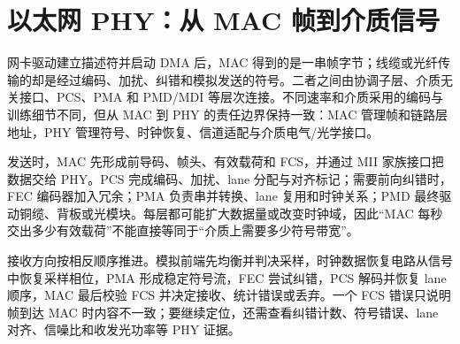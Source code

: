 \section{以太网 PHY：从 MAC 帧到介质信号}

网卡驱动建立描述符并启动 DMA 后，MAC 得到的是一串帧字节；线缆或光纤传输的却是经过编码、加扰、纠错和模拟发送的符号。二者之间由协调子层、介质无关接口、PCS、PMA 和 PMD/MDI 等层次连接。不同速率和介质采用的编码与训练细节不同，但从 MAC 到 PHY 的责任边界保持一致：MAC 管理帧和链路层地址，PHY 管理符号、时钟恢复、信道适配与介质电气/光学接口。\cite{ieee8023-baselines}

发送时，MAC 先形成前导码、帧头、有效载荷和 FCS，并通过 MII 家族接口把数据交给 PHY。PCS 完成编码、加扰、lane 分配与对齐标记；需要前向纠错时，FEC 编码器加入冗余；PMA 负责串并转换、lane 复用和时钟关系；PMD 最终驱动铜缆、背板或光模块。每层都可能扩大数据量或改变时钟域，因此“MAC 每秒交出多少有效载荷”不能直接等同于“介质上需要多少符号带宽”。

接收方向按相反顺序推进。模拟前端先均衡并判决采样，时钟数据恢复电路从信号中恢复采样相位，PMA 形成稳定符号流，FEC 尝试纠错，PCS 解码并恢复 lane 顺序，MAC 最后校验 FCS 并决定接收、统计错误或丢弃。一个 FCS 错误只说明帧到达 MAC 时内容不一致；要继续定位，还需查看纠错计数、符号错误、lane 对齐、信噪比和收发光功率等 PHY 证据。

